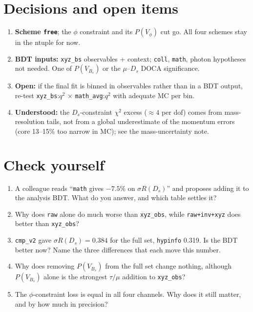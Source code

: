 \documentclass[10pt,a4paper]{article}
\newcommand{\code}[1]{\texttt{#1}}
\newcommand{\Ds}{D_s}
\newcommand{\PV}{P(V_{B_s})}
\newcommand{\sR}{\sigma R}
\begin{document}
\section{Decisions and open items}

\begin{enumerate}
\item \textbf{Scheme \code{free}}; the $\phi$ constraint and its $P(V_\phi)$ cut go. All four schemes stay in the ntuple
  for now.
\item \textbf{BDT inputs:} \code{xyz\_bs} observables + context; \code{coll}, \code{math}, photon hypotheses not needed.
  One of $\PV$ or the $\mu$--$\Ds$ DOCA significance.
\item \textbf{Open:} if the final fit is binned in observables rather than in a BDT output, re-test
  \code{xyz\_bs}:$q^2$ $\times$ \code{math\_avg}:$q^2$ with adequate MC per bin.
\item \textbf{Understood:} the $\Ds$-constraint $\chi^2$ excess ($\approx4$ per dof) comes from mass-resolution tails, not
  from a global underestimate of the momentum errors (core 13--15\% too narrow in MC); see the mass-uncertainty note.
\end{enumerate}

\section*{Check yourself}

\begin{enumerate}[label=\textbf{\arabic*.}]
\item A colleague reads ``\code{math} gives $-7.5\%$ on $\sR(\Ds)$'' and proposes adding it to the analysis BDT. What
  do you answer, and which table settles it?
\item Why does \code{raw} alone do much worse than \code{xyz\_obs}, while \code{raw+inv+xyz} does better than
  \code{xyz\_obs}?
\item \code{cmp\_v2} gave $\sR(\Ds)=0.384$ for the full set, \code{hypinfo} 0.319. Is the BDT better now? Name the
  three differences that each move this number.
\item Why does removing $\PV$ from the full set change nothing, although $\PV$ alone is the strongest $\tau/\mu$
  addition to \code{xyz\_obs}?
\item The $\phi$-constraint loss is equal in all four channels. Why does it still matter, and by how much in precision?
\end{enumerate}
\end{document}
